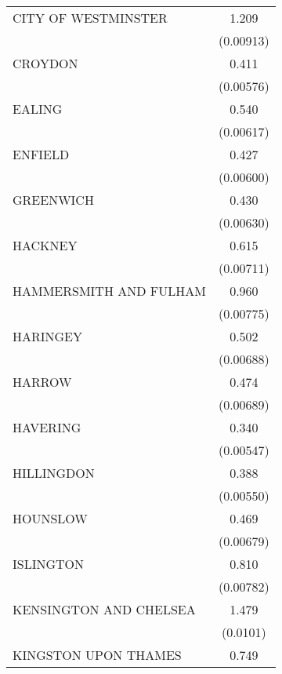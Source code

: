 {\begin{longtable}{l*{1}{c}}
\addlinespace
CITY OF WESTMINSTER &       1.209\sym{***}\\
                    &   (0.00913)         \\
\addlinespace
CROYDON             &       0.411\sym{***}\\
                    &   (0.00576)         \\
\addlinespace
EALING              &       0.540\sym{***}\\
                    &   (0.00617)         \\
\addlinespace
ENFIELD             &       0.427\sym{***}\\
                    &   (0.00600)         \\
\addlinespace
GREENWICH           &       0.430\sym{***}\\
                    &   (0.00630)         \\
\addlinespace
HACKNEY             &       0.615\sym{***}\\
                    &   (0.00711)         \\
\addlinespace
HAMMERSMITH AND FULHAM&       0.960\sym{***}\\
                    &   (0.00775)         \\
\addlinespace
HARINGEY            &       0.502\sym{***}\\
                    &   (0.00688)         \\
\addlinespace
HARROW              &       0.474\sym{***}\\
                    &   (0.00689)         \\
\addlinespace
HAVERING            &       0.340\sym{***}\\
                    &   (0.00547)         \\
\addlinespace
HILLINGDON          &       0.388\sym{***}\\
                    &   (0.00550)         \\
\addlinespace
HOUNSLOW            &       0.469\sym{***}\\
                    &   (0.00679)         \\
\addlinespace
ISLINGTON           &       0.810\sym{***}\\
                    &   (0.00782)         \\
\addlinespace
KENSINGTON AND CHELSEA&       1.479\sym{***}\\
                    &    (0.0101)         \\
\addlinespace
KINGSTON UPON THAMES&       0.749\sym{***}\\

\end{longtable}}

